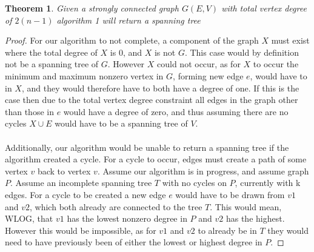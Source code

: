 \documentclass{article}
\newtheorem{theorem}{Theorem}
\begin{document}
\begin{theorem}
Given a strongly connected graph $G(E,V)$ with total vertex degree of $2(n-1)$ algorithm 1 will return a spanning tree
\end{theorem}
\begin{proof}

For our algorithm to not complete, a component of the graph $X$ must exist where the total degree of $X$ is 0, and $X$ is not $G$. This case would by definition not be a spanning tree of $G$. However $X$ could not occur, as for $X$ to occur the minimum and maximum nonzero vertex in $G$, forming new edge $e$, would have to in $X$, and they would therefore have to both have a degree of one. If this is the case then due to the total vertex degree constraint all edges in the graph other than those in $e$ would have a degree of zero, and thus assuming there are no cycles $X \cup E$ would have to be a spanning tree of $V$.
\\\\
Additionally, our algorithm would be unable to return a spanning tree if the algorithm created a cycle. For a cycle to occur, edges must create a path of some vertex $v$ back to vertex $v$.  Assume our algorithm is in progress, and assume graph $P$. Assume an incomplete spanning tree $T$ with no cycles on $P$, currently with k edges. For a cycle to be created a new edge $e$ would have to be drawn from $v1$ and $v2$, which both already are connected to the tree $T$. This would mean, WLOG, that $v1$ has the lowest nonzero degree in $P$ and $v2$ has the highest. However this would be impossible, as for $v1$ and $v2$ to already be in $T$ they would need to have previously been of either the lowest or highest degree in $P$.

\end{proof}
\end{document}
